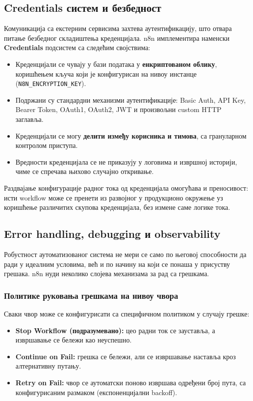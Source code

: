 \subsection{Credentials систем и безбедност}

Комуникација са екстерним сервисима захтева аутентификацију, што
отвара питање безбедног складиштења креденцијала. n8n имплементира
наменски \textbf{Credentials} подсистем са следећим својствима:

\begin{itemize}
    \item Креденцијали се чувају у бази података у
    \textbf{енкриптованом облику}, коришћењем кључа који је
    конфигурисан на нивоу инстанце (\texttt{N8N\_ENCRYPTION\_KEY}).
    \item Подржани су стандардни механизми аутентификације:
    Basic Auth, API Key, Bearer Token, OAuth1, OAuth2, JWT и
    произвољни custom HTTP заглавља.
    \item Креденцијали се могу \textbf{делити између корисника и
    тимова}, са грануларном контролом приступа.
    \item Вредности креденцијала се не приказују у логовима и
    извршној историји, чиме се спречава њихово случајно откривање.
\end{itemize}

Раздвајање конфигурације радног тока од креденцијала омогућава
и преносивост: исти workflow може се пренети из развојног у
продукционо окружење уз коришћење различитих скупова креденцијала,
без измене саме логике тока.

\subsection{Error handling, debugging и observability}

Робустност аутоматизованог система не мери се само по његовој
способности да ради у идеалним условима, већ и по начину на који
се понаша у присуству грешака. n8n нуди неколико слојева механизама
за рад са грешкама.

\subsubsection{Политике руковања грешкама на нивоу чвора}

Сваки чвор може се конфигурисати са специфичном политиком у случају
грешке:

\begin{itemize}
    \item \textbf{Stop Workflow (подразумевано):} цео радни ток се
    зауставља, а извршавање се бележи као неуспешно.
    \item \textbf{Continue on Fail:} грешка се бележи, али се
    извршавање наставља кроз алтернативну путању.
    \item \textbf{Retry on Fail:} чвор се аутоматски поново извршава
    одређени број пута, са конфигурисаним размаком (експоненцијални
    backoff).
\end{itemize}

